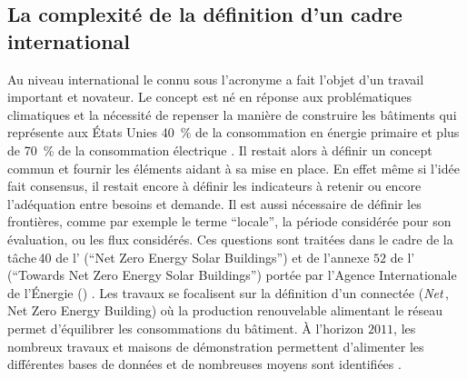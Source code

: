 \subsection{La complexité de la définition d’un cadre international} %
\label{sub:la_definition_d_un_cadre_international}
Au niveau international le  connu sous l’acronyme  a fait l’objet d’un
travail important et novateur.
Le concept est né en réponse aux problématiques climatiques et la nécessité
de repenser la manière de construire les bâtiments qui représente aux États Unies
\SI{40}{\percent} de la consommation en énergie primaire et plus de \SI{70}{\percent}
de la consommation électrique \parencite{Torcellini2006a}. Il
restait alors à définir un concept commun et fournir les éléments aidant à sa mise en
place. En effet même si l’idée fait consensus, il restait encore à définir les indicateurs
à retenir ou encore l’adéquation entre besoins et demande.
Il est aussi nécessaire de définir les frontières, comme par exemple le terme \enquote{locale},
la période considérée pour son évaluation, ou les flux considérés. Ces questions sont traitées
dans le cadre de la tâche\,40 de l’ (\enquote{Net Zero Energy Solar Buildings}) et de l’annexe $52$ de
l’ (\enquote{Towards Net Zero Energy Solar Buildings}) portée par l’Agence Internationale
de l’Énergie () . Les travaux se focalisent
sur la définition d’un  connectée (\textit{Net}\,, Net Zero Energy Building) où
la production renouvelable alimentant le réseau permet d’équilibrer les consommations du bâtiment.
À l’horizon $2011$, les nombreux travaux et maisons de démonstration permettent d’alimenter
les différentes bases de données et de nombreuses moyens sont identifiées
\parencite{Marszal2011971}.


